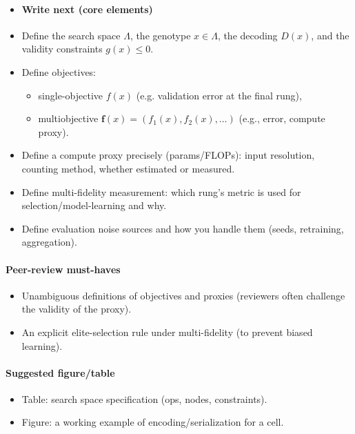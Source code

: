 \begin{itemize}
    \item \paragraph{Write next (core elements)}
\end{itemize}
\begin{itemize}
  \begin{itemize}
      \item Define the search space $\Lambda$, the genotype $x \in \Lambda$, the decoding $D(x)$, and the validity constraints $g(x)\le 0$.
      \item Define objectives:
      \begin{itemize}
      \item single-objective $f(x)$ (e.g. validation error at the final rung),
      \item multiobjective $\mathbf{f}(x)=(f_1(x), f_2(x), \dots)$ (e.g., error, compute proxy).
      \end{itemize}
      \item Define a compute proxy precisely (params/FLOPs): input resolution, counting method, whether estimated or measured.
      \item Define multi-fidelity measurement: which rung’s metric is used for selection/model-learning and why.
      \item Define evaluation noise sources and how you handle them (seeds, retraining, aggregation).
  \end{itemize}
\end{itemize}

\paragraph{Peer-review must-haves}
\begin{itemize}
  \item Unambiguous definitions of objectives and proxies (reviewers often challenge the validity of the proxy).
  \item An explicit elite-selection rule under multi-fidelity (to prevent biased learning).
\end{itemize}

\paragraph{Suggested figure/table}
\begin{itemize}
  \item Table: search space specification (ops, nodes, constraints).
  \item Figure: a working example of encoding/serialization for a cell.
\end{itemize}
